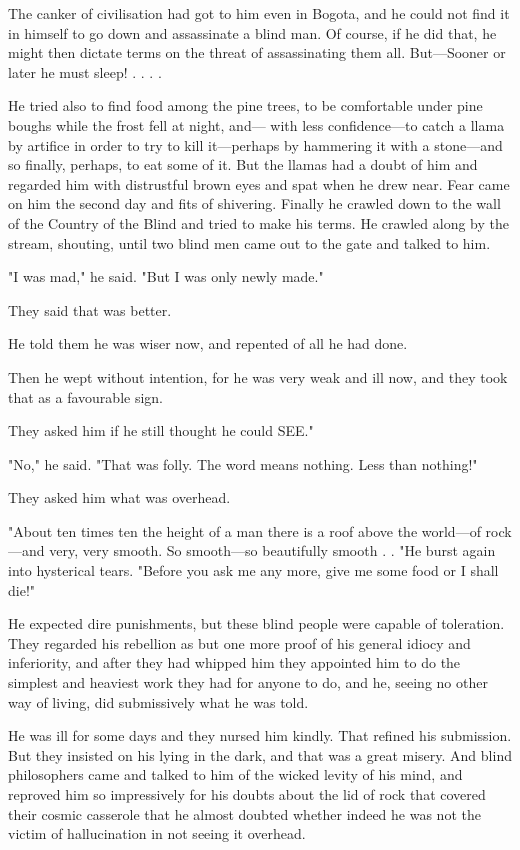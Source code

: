 \documentclass[submission]{sffms}
\begin{document}
The canker of civilisation had got to him even in Bogota, and he could
not find it in himself to go down and assassinate a blind man. Of
course, if he did that, he might then dictate terms on the threat of
assassinating them all. But---Sooner or later he must sleep! . . . .

He tried also to find food among the pine trees, to be comfortable
under pine boughs while the frost fell at night, and--- with less
confidence---to catch a llama by artifice in order to try to kill
it---perhaps by hammering it with a stone---and so finally, perhaps, to
eat some of it. But the llamas had a doubt of him and regarded him
with distrustful brown eyes and spat when he drew near.  Fear came on
him the second day and fits of shivering. Finally he crawled down to
the wall of the Country of the Blind and tried to make his terms. He
crawled along by the stream, shouting, until two blind men came out to
the gate and talked to him.

"I was mad," he said. "But I was only newly made."

They said that was better.

He told them he was wiser now, and repented of all he had done.

Then he wept without intention, for he was very weak and ill now, and
they took that as a favourable sign.

They asked him if he still thought he could SEE."

"No," he said. "That was folly. The word means nothing. Less than
nothing!"

They asked him what was overhead.

"About ten times ten the height of a man there is a roof above the
world---of rock---and very, very smooth. So smooth---so beautifully
smooth . . "He burst again into hysterical tears. "Before you ask me
any more, give me some food or I shall die!"

He expected dire punishments, but these blind people were capable of
toleration.  They regarded his rebellion as but one more proof of his
general idiocy and inferiority, and after they had whipped him they
appointed him to do the simplest and heaviest work they had for anyone
to do, and he, seeing no other way of living, did submissively what he
was told.

He was ill for some days and they nursed him kindly. That refined his
submission. But they insisted on his lying in the dark, and that was a
great misery. And blind philosophers came and talked to him of the
wicked levity of his mind, and reproved him so impressively for his
doubts about the lid of rock that covered their cosmic casserole that
he almost doubted whether indeed he was not the victim of
hallucination in not seeing it overhead.
\end{document}
